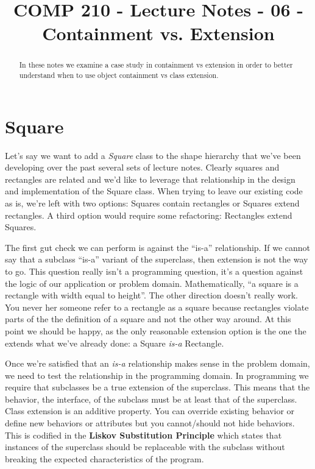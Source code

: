 \documentclass[]{tufte-handout}
\title{COMP 210 - Lecture Notes - 06 - Containment vs. Extension}
\begin{document}
\maketitle

\begin{abstract}
In these notes we examine a case study in containment vs extension in order to better understand when to use object containment vs class extension.
\end{abstract}

\section{Square}

Let's say we want to add a \textit{Square} class to the shape hierarchy that we've been developing over the past several sets of lecture notes. Clearly squares and rectangles are related and we'd like to leverage that relationship in the design and implementation of the Square class. When trying to leave our existing code as is, we're left with two options: Squares contain rectangles or Squares extend rectangles. A third option would require some refactoring: Rectangles extend Squares.

The first gut check we can perform is against the ``is-a'' relationship. If we cannot say that a subclass ``is-a'' variant of the superclass, then extension is not the way to go. This question really isn't a programming question, it's a question against the logic of our application or problem domain. Mathematically, ``a square is a rectangle with width equal to height''.  The other direction doesn't really work. You never her someone refer to a rectangle as a square because rectangles violate parts of the the definition of a square and not the other way around. At this point we should be happy, as the only reasonable extension option is the one the extends what we've already done: a Square \textit{is-a} Rectangle.

Once we're satisfied that an \textit{is-a} relationship makes sense in the problem domain, we need to test the relationship in the programming domain. In programming we require that subclasses be a true extension of the superclass. This means that the behavior, the interface, of the subclass must be at least that of the superclass.  Class extension is an additive property. You can override existing behavior or define new behaviors or attributes but you cannot/should not hide behaviors.  This is codified in the \textbf{Liskov Substitution Principle} which states that instances of the superclass should be replaceable with the subclass without breaking the expected characteristics of the program.
\end{document}

